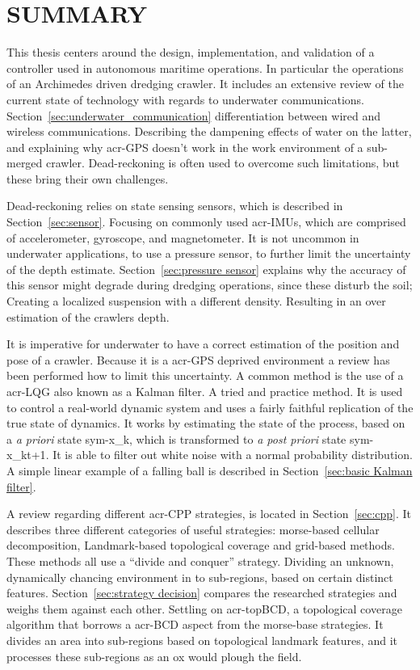 

\chapter{SUMMARY}\label{chap:sum}

This thesis centers around the design, implementation, and validation of a controller used in autonomous maritime
operations. In particular the operations of an Archimedes driven dredging crawler. It includes an extensive review of
the current state of technology with regards to underwater communications. Section~\ref{sec:underwater_communication}
differentiation between wired and wireless communications. Describing the dampening effects of water on the latter,
and explaining why \gls{acr-GPS} doesn't work in the work environment of a sub-merged crawler. Dead-reckoning is
often used to overcome such limitations, but these bring their own challenges.

Dead-reckoning relies on state sensing sensors, which is described in Section~\ref{sec:sensor}. Focusing on
commonly used \glspl{acr-IMU}, which are comprised of accelerometer, gyroscope, and magnetometer. It is not uncommon
in underwater applications, to use a pressure sensor, to further limit the uncertainty of the depth estimate.
Section~\ref{sec:pressure sensor} explains why the accuracy of this sensor might degrade during dredging operations,
since these disturb the soil; Creating a localized suspension with a different density. Resulting in an over
estimation of the crawlers depth.

It is imperative for underwater to have a correct estimation of the position and pose of a crawler. Because it is a
\gls{acr-GPS} deprived environment a review has been performed how to limit this uncertainty. A common method is the
use of a \gls{acr-LQG} also known as a Kalman filter. A tried and practice method. It is used to control a
real-world dynamic system and uses a fairly faithful replication of the true state of dynamics. It works by
estimating the state of the process, based on a \textit{a priori} state \gls{sym-x_k}, which is transformed to \textit{a
post priori} state \gls{sym-x_kt+1}. It is able to filter out white noise with a normal probability distribution. A
simple linear example of a falling ball is described in Section~\ref{sec:basic Kalman filter}.

A review regarding different \gls{acr-CPP} strategies, is located in Section~\ref{sec:cpp}. It describes three
different categories of useful strategies: morse-based cellular decomposition, Landmark-based topological coverage
and grid-based methods. These methods all use a ``divide and conquer'' strategy. Dividing an unknown, dynamically
chancing environment in to sub-regions, based on certain distinct features. Section~\ref{sec:strategy decision}
compares the researched strategies and weighs them against each other. Settling on \gls{acr-topBCD}, a topological
coverage algorithm that borrows a \gls{acr-BCD} aspect from the morse-base strategies. It divides an area into
sub-regions based on topological landmark features, and it processes these sub-regions as an ox would plough the field.

